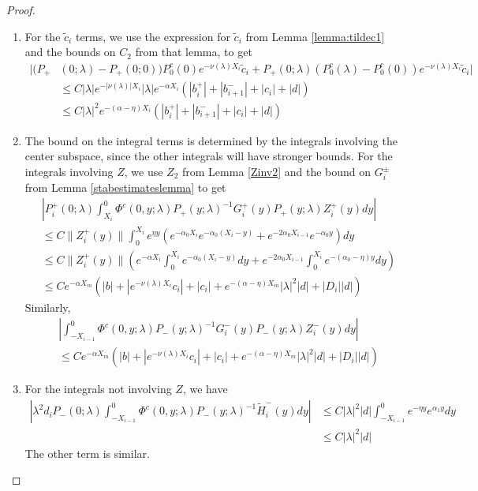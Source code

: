 \documentclass[thesis.tex]{subfiles}
\begin{document}
\begin{lemma}
\begin{proof}
\begin{enumerate}
\item For the $\tilde{c}_i$ terms, we use the expression for $\tilde{c}_i$ from Lemma \ref{lemma:tildec1} and the bounds on $C_2$ from that lemma, to get
\begin{align*}
|(P_+&(0; \lambda) - P_+(0; 0))P_0^c(0) e^{-\nu(\lambda)X_i} \tilde{c}_i + P_+(0; \lambda) (P_0^c(\lambda) - P_0^c(0)) e^{-\nu(\lambda)X_i} \tilde{c}_i| \\
&\leq C |\lambda| e^{-|\nu(\lambda)|X_i} |\lambda| e^{-\alpha X_i} \left( |b_i^+| + |b_{i+1}^-| + |c_i| + |d| \right) \\
&\leq C |\lambda|^2 e^{-(\alpha - \eta)X_i} \left( |b_i^+| + |b_{i+1}^-| + |c_i| + |d| \right) 
\end{align*}

\item The bound on the integral terms is determined by the integrals involving the center subspace, since the other integrals will have stronger bounds. For the integrals involving $Z$, we use $Z_2$ from Lemma \ref{Zinv2} and the bound on $G_i^\pm$ from Lemma \ref{stabestimateslemma} to get
\begin{align*}
&\left| P_i^+(0; \lambda) \int_{X_i}^0 \Phi^c(0, y; \lambda) P_+(y; \lambda)^{-1} G_i^+(y) P_+(y; \lambda) Z_i^+(y) dy \right| \\
&\leq C \| Z_i^+(y) \| \int_0^{X_i} e^{\eta y} \left( e^{-\alpha_0 X_i} e^{-\alpha_0(X_i - y) } + e^{-2 \alpha_0 X_{i-1}} e^{-\alpha_0 y} \right) dy \\
&\leq C \| Z_i^+(y) \| \left( e^{-\alpha X_i} \int_0^{X_i} e^{-\alpha_0(X_i - y) } dy + e^{-2 \alpha_0 X_{i-1}} \int_0^{X_i} e^{-(\alpha_0 - \eta) y}dy \right) \\
&\leq C e^{-\alpha X_m} (|b| + |e^{-\nu(\lambda)X_i} c_i| + |c_i| + e^{-(\alpha - \eta) X_m}|\lambda|^2|d| + |D_i||d|)
\end{align*}
Similarly,
\begin{align*}
&\left| \int_{-X_{i-1}}^0 \Phi^c(0, y; \lambda) P_-(y; \lambda)^{-1} G_i^-(y) P_-(y; \lambda)Z_i^-(y) dy \right| \\
&\leq C e^{-\alpha X_m} (|b| + |e^{-\nu(\lambda)X_i} c_i| + |c_i| + e^{-(\alpha - \eta) X_m}|\lambda|^2|d| + |D_i||d|)
\end{align*}

\item For the integrals not involving $Z$, we have
\begin{align*}
\left| \lambda^2 d_i P_-(0; \lambda) \int_{-X_{i-1}}^0 \Phi^c(0, y; \lambda) P_-(y; \lambda)^{-1} \tilde{H}_i^-(y) dy \right| &\leq C |\lambda|^2 |d| \int_{-X_{i-1}}^0 e^{-\eta y} e^{\alpha_1 y} dy \\
&\leq C |\lambda|^2 |d|
\end{align*}
The other term is similar.
\end{enumerate}


\end{proof}
\end{lemma}
\end{document}
